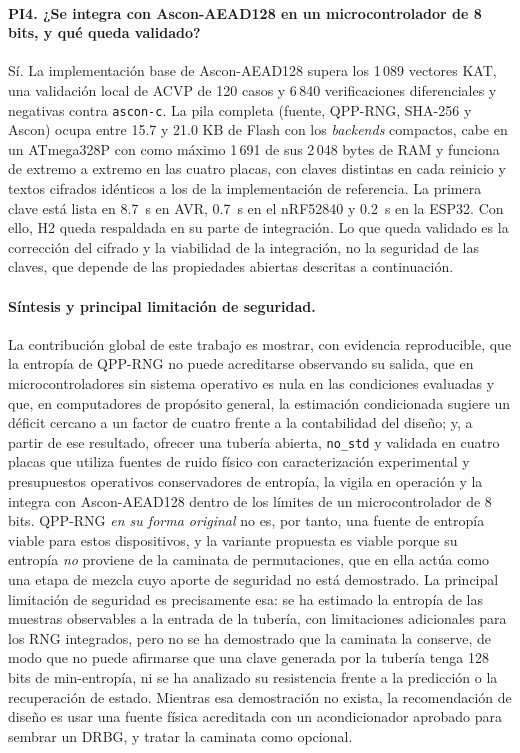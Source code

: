 \paragraph{PI4. ¿Se integra con Ascon-AEAD128 en un microcontrolador de 8 bits, y qué queda validado?} Sí. La implementación base de Ascon-AEAD128 supera los 1\,089 vectores KAT, una validación local de ACVP de 120 casos y 6\,840 verificaciones diferenciales y negativas contra \texttt{ascon-c}. La pila completa (fuente, QPP-RNG, SHA-256 y Ascon) ocupa entre 15.7 y 21.0 KB de Flash con los \textit{backends} compactos, cabe en un ATmega328P con como máximo 1\,691 de sus 2\,048 bytes de RAM y funciona de extremo a extremo en las cuatro placas, con claves distintas en cada reinicio y textos cifrados idénticos a los de la implementación de referencia. La primera clave está lista en 8.7~s en AVR, 0.7~s en el nRF52840 y 0.2~s en la ESP32. Con ello, H2 queda respaldada en su parte de integración. Lo que queda validado es la corrección del cifrado y la viabilidad de la integración, no la seguridad de las claves, que depende de las propiedades abiertas descritas a continuación.

\paragraph{Síntesis y principal limitación de seguridad.} La contribución global de este trabajo es mostrar, con evidencia reproducible, que la entropía de QPP-RNG no puede acreditarse observando su salida, que en microcontroladores sin sistema operativo es nula en las condiciones evaluadas y que, en computadores de propósito general, la estimación condicionada sugiere un déficit cercano a un factor de cuatro frente a la contabilidad del diseño; y, a partir de ese resultado, ofrecer una tubería abierta, \texttt{no\_std} y validada en cuatro placas que utiliza fuentes de ruido físico con caracterización experimental y presupuestos operativos conservadores de entropía, la vigila en operación y la integra con Ascon-AEAD128 dentro de los límites de un microcontrolador de 8 bits. QPP-RNG \emph{en su forma original} no es, por tanto, una fuente de entropía viable para estos dispositivos, y la variante propuesta es viable porque su entropía \emph{no} proviene de la caminata de permutaciones, que en ella actúa como una etapa de mezcla cuyo aporte de seguridad no está demostrado. La principal limitación de seguridad es precisamente esa: se ha estimado la entropía de las muestras observables a la entrada de la tubería, con limitaciones adicionales para los RNG integrados, pero no se ha demostrado que la caminata la conserve, de modo que no puede afirmarse que una clave generada por la tubería tenga 128 bits de min-entropía, ni se ha analizado su resistencia frente a la predicción o la recuperación de estado. Mientras esa demostración no exista, la recomendación de diseño es usar una fuente física acreditada con un acondicionador aprobado para sembrar un DRBG, y tratar la caminata como opcional.

